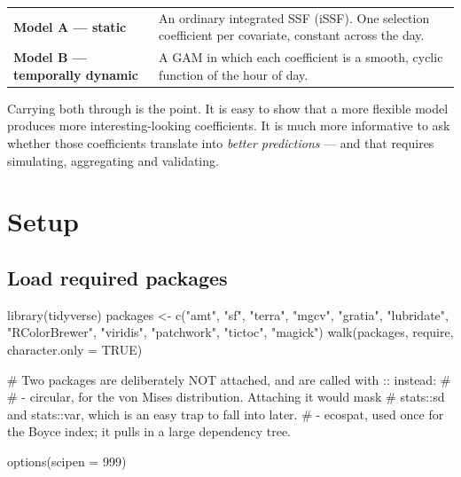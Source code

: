 \documentclass[
  letterpaper,
  DIV=11,
  numbers=noendperiod]{scrartcl}
\newenvironment{Shaded}{\begin{snugshade}}{\end{snugshade}}
\newcommand{\AttributeTok}[1]{\textcolor[rgb]{0.40,0.45,0.13}{#1}}
\newcommand{\CommentTok}[1]{\textcolor[rgb]{0.37,0.37,0.37}{#1}}
\newcommand{\ConstantTok}[1]{\textcolor[rgb]{0.56,0.35,0.01}{#1}}
\newcommand{\DecValTok}[1]{\textcolor[rgb]{0.68,0.00,0.00}{#1}}
\newcommand{\FunctionTok}[1]{\textcolor[rgb]{0.28,0.35,0.67}{#1}}
\newcommand{\NormalTok}[1]{\textcolor[rgb]{0.00,0.23,0.31}{#1}}
\newcommand{\OtherTok}[1]{\textcolor[rgb]{0.00,0.23,0.31}{#1}}
\newcommand{\StringTok}[1]{\textcolor[rgb]{0.13,0.47,0.30}{#1}}
\newcounter{none} %
\begin{document}
{\def\LTcaptype{none} %
\begin{longtable}[]{@{}
  >{\raggedright\arraybackslash}p{}
  >{\raggedright\arraybackslash}p{}@{}}
\toprule\noalign{}
\endhead
\bottomrule\noalign{}
\endlastfoot
\textbf{Model A --- static} & An ordinary integrated SSF (iSSF). One
selection coefficient per covariate, constant across the day. \\
\textbf{Model B --- temporally dynamic} & A GAM in which each
coefficient is a smooth, cyclic function of the hour of day. \\
\end{longtable}
}

Carrying both through is the point. It is easy to show that a more
flexible model produces more interesting-looking coefficients. It is
much more informative to ask whether those coefficients translate into
\emph{better predictions} --- and that requires simulating, aggregating
and validating.

\section{Setup}\label{setup}

\subsection{Load required packages}\label{load-required-packages}

\begin{Shaded}
\begin{Highlighting}[]
\FunctionTok{library}\NormalTok{(tidyverse)}
\NormalTok{packages }\OtherTok{\textless{}{-}} \FunctionTok{c}\NormalTok{(}\StringTok{"amt"}\NormalTok{, }\StringTok{"sf"}\NormalTok{, }\StringTok{"terra"}\NormalTok{, }\StringTok{"mgcv"}\NormalTok{, }\StringTok{"gratia"}\NormalTok{, }\StringTok{"lubridate"}\NormalTok{,}
              \StringTok{"RColorBrewer"}\NormalTok{, }\StringTok{"viridis"}\NormalTok{, }\StringTok{"patchwork"}\NormalTok{, }\StringTok{"tictoc"}\NormalTok{, }\StringTok{"magick"}\NormalTok{)}
\FunctionTok{walk}\NormalTok{(packages, require, }\AttributeTok{character.only =} \ConstantTok{TRUE}\NormalTok{)}

\CommentTok{\# Two packages are deliberately NOT attached, and are called with \textasciigrave{}::\textasciigrave{} instead:}
\CommentTok{\#}
\CommentTok{\#  {-} \textasciigrave{}circular\textasciigrave{}, for the von Mises distribution. Attaching it would mask}
\CommentTok{\#    \textasciigrave{}stats::sd\textasciigrave{} and \textasciigrave{}stats::var\textasciigrave{}, which is an easy trap to fall into later.}
\CommentTok{\#  {-} \textasciigrave{}ecospat\textasciigrave{}, used once for the Boyce index; it pulls in a large dependency tree.}

\FunctionTok{options}\NormalTok{(}\AttributeTok{scipen =} \DecValTok{999}\NormalTok{)}
\end{Highlighting}
\end{Shaded}
\end{document}
